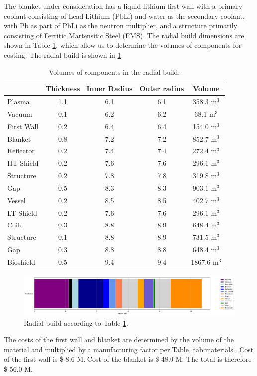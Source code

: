 The blanket under consideration has a liquid lithium first wall with a primary coolant consisting of Lead Lithium (PbLi) and water as the secondary coolant, with Pb as part of PbLi as the neutron multiplier, and a structure primarily consisting of Ferritic Martensitic Steel (FMS). The radial build dimensions are shown in Table \ref{tab:volumes}, which allow us to determine the volumes of components for costing.  The radial build is shown in \ref{fig:radial}.  \\


\begin{table}[h!]
    \centering
    \begin{tabular}{l c  c c c}
    \hline
        &	Thickness	&	Inner Radius	&	Outer radius	&	Volume		\\
        \hline
Plasma	&	1.1	&	6.1	&	6.1	&	358.3	m$^{3}$	\\
Vacuum	&	0.1	&	6.2	&	6.2	&	68.1	m$^{3}$	\\
First Wall	&	0.2	&	6.4	&	6.4	&	154.0	m$^{3}$	\\
Blanket	&	0.8	&	7.2	&	7.2	&	852.7	m$^{3}$	\\
Reflector	&	0.2	&	7.4	&	7.4	&	272.4	m$^{3}$	\\
HT Shield	&	0.2	&	7.6	&	7.6	&	296.1	m$^{3}$	\\
Structure	&	0.2	&	7.8	&	7.8	&	319.8	m$^{3}$	\\
Gap	&	0.5	&	8.3	&	8.3	&	903.1	m$^{3}$	\\
Vessel	&	0.2	&	8.5	&	8.5	&	402.7	m$^{3}$	\\
LT Shield	&	0.2	&	7.6	&	7.6	&	296.1	m$^{3}$	\\
Coils	&	0.3	&	8.8	&	8.9	&	648.4	m$^{3}$	\\
Structure	&	0.1	&	8.8	&	8.9	&	731.5	m$^{3}$	\\
Gap	&	0.3	&	8.8	&	8.8	&	648.4	m$^{3}$	\\
Bioshield	&	0.5	&	9.4	&	9.4	&	1867.6	m$^{3}$	\\

        \hline
    \end{tabular}
    \caption{Volumes of components in the radial build.}
    \label{tab:volumes}
\end{table}

\begin{figure}
    \centering
    \includegraphics[width=0.9\linewidth]{Figures/radial_build.pdf}
    \caption{Radial build according to Table \ref{tab:volumes}.}
    \label{fig:radial}
\end{figure}



The costs of the first wall and blanket are determined by the volume of the material and multiplied by a manufacturing factor per Table \ref{tab:materials}.   Cost of the first wall is \$ 8.6 M.  Cost of the blanket is \$ 48.0 M. The total is therefore \$ 56.0 M.

